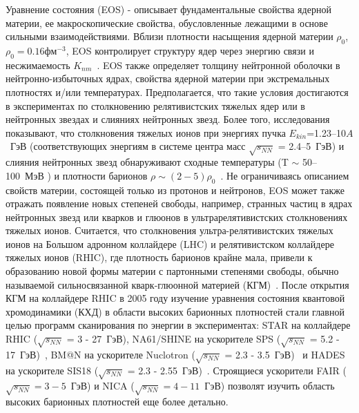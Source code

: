 {\actuality} Уравнение состояния (EOS) - описывает фундаментальные свойства ядерной материи, ее  макроскопические свойства, обусловленные лежащими в основе сильными взаимодействиями.  
Вблизи плотности насыщения ядерной материи $\rho_{0}$, $\rho_{0}=0.16 фм^{-3}$,  EOS контролирует структуру ядер через энергию связи и несжимаемость $K_{nm}$~\cite[B][]{Danielewicz:2002pu}.
EOS также определяет толщину нейтронной оболочки в нейтронно-избыточных ядрах, свойства ядерной материи при экстремальных плотностях и/или температурах.
Предполагается, что такие условия достигаются в экспериментах по столкновению релятивистских тяжелых ядер или в нейтронных звездах и слияниях нейтронных звезд. 
Более того, исследования показывают, что столкновения тяжелых ионов при энергиях пучка  $E_{kin}$=1.23--10$A$~ГэВ (соответствующих энергиям в системе центра масс $\sqrt{s_{NN}}$ = 2.4--5~ГэВ)  и слияния нейтронных звезд обнаруживают сходные температуры (T $\sim$  50--100~МэВ ) и плотности барионов $\rho \sim (2-5)\rho_{0}$~\cite{Bzdak:2019pkr,Xu:2022mqn}.
Не ограничиваясь описанием свойств материи, состоящей только из протонов и нейтронов, EOS может также отражать появление новых степеней свободы, например, странных частиц в ядрах нейтронных звезд или кварков и глюонов в ультрарелятивистских столкновениях тяжелых ионов. 
Считается, что столкновения ультра-релятивистских тяжелых ионов на Большом адронном коллайдере (LHC) и релятивистском коллайдере тяжелых ионов (RHIC), где  плотность барионов крайне мала, привели к образованию новой формы материи с партонными степенями свободы, обычно называемой сильносвязанной кварк-глюонной материей (КГМ)~\cite{Esumi:2022uas}.
После открытия КГМ на коллайдере RHIC в 2005 году изучение уравнения состояния  квантовой хромодинамики (КХД) в области высоких барионных плотностей стали главной целью программ сканирования по энергии в экспериментах: STAR на коллайдере RHIC ($\sqrt{s_{NN}}$ = 3 - 27~ГэВ), NA61/SHINE на ускорителе  SPS ($\sqrt{s_{NN}}$ = 5.2 - 17~ГэВ)~\cite{NA61:2014lfx}, BM@N на ускорителе Nuclotron ($\sqrt{s_{NN}}$ = 2.3 - 3.5~ГэВ)~\cite{Senger:2022bzm} и   HADES на ускорителе  SIS18 ($\sqrt{s_{NN}}$ = 2.3 - 2.55~ГэВ)~\cite{HADES:2009aat}. 
Строящиеся ускорители FAIR ($\sqrt{s_{NN}}=3-5$~ГэВ) и NICA ($\sqrt{s_{NN}}=4-11$~ГэВ)  позволят изучить  область высоких барионных плотностей еще более детально.

